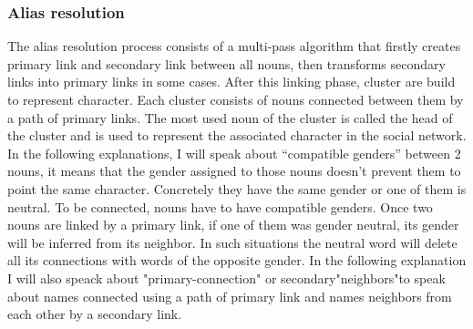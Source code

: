 \documentclass[a4paper, 12pt]{report}
\begin{document}
\subsubsection{Alias resolution}
\label{section:alias}
The alias resolution process consists of a multi-pass algorithm that firstly creates primary link and secondary link between all nouns, then transforms secondary links into  primary links in some cases. After this linking phase, cluster are build to represent character. Each cluster consists of nouns connected between them by a path of primary links. The most used noun of the cluster is called the head of the cluster and is used to represent the associated character in the social network. In the following explanations, I will speak about ``compatible genders'' between 2 nouns, it means that the gender assigned to those nouns doesn't prevent them to point the same character. Concretely they have the same gender or one of them is neutral. To be connected, nouns have to have compatible genders. Once two nouns are linked by a  primary link, if one of them was gender neutral, its gender will be inferred from its neighbor. In such situations the neutral word will delete all its connections with words of the opposite gender. In the following explanation I will also speack about "primary-connection" or secondary"neighbors"to speak about names connected using a path of primary link and names neighbors from each other by a secondary link. \\
\end{document}
